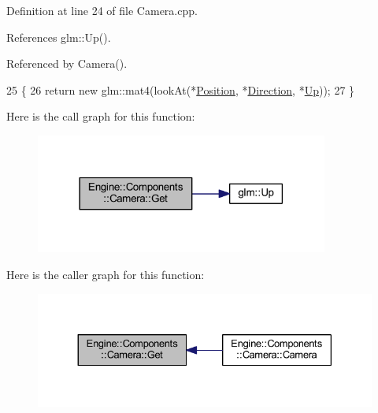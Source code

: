 Definition at line 24 of file Camera.\+cpp.



References glm\+::\+Up().



Referenced by Camera().


\begin{DoxyCode}
25 \{
26     \textcolor{keywordflow}{return} \textcolor{keyword}{new} glm::mat4(lookAt(*\mbox{\hyperlink{classEngine_1_1Components_1_1Camera_ab2c3ed9a1321a95db8fca95bc7f4b290}{Position}}, *\mbox{\hyperlink{classEngine_1_1Components_1_1Camera_a23619a66046258f1158313f0c790ffa2}{Direction}}, *\mbox{\hyperlink{classEngine_1_1Components_1_1Camera_a84a4199b9c60579a0f148b9980e05200}{Up}}));
27 \}
\end{DoxyCode}
Here is the call graph for this function\+:
\nopagebreak
\begin{figure}[H]
\begin{center}
\leavevmode
\includegraphics[width=273pt]{classEngine_1_1Components_1_1Camera_ad24b41321813d1757cb6dd0db52e34dd_cgraph}
\end{center}
\end{figure}
Here is the caller graph for this function\+:
\nopagebreak
\begin{figure}[H]
\begin{center}
\leavevmode
\includegraphics[width=330pt]{classEngine_1_1Components_1_1Camera_ad24b41321813d1757cb6dd0db52e34dd_icgraph}
\end{center}
\end{figure}
\mbox{\label{classObservable_afaa016d6c6b8a6fad20bb388d35ca014}} 
